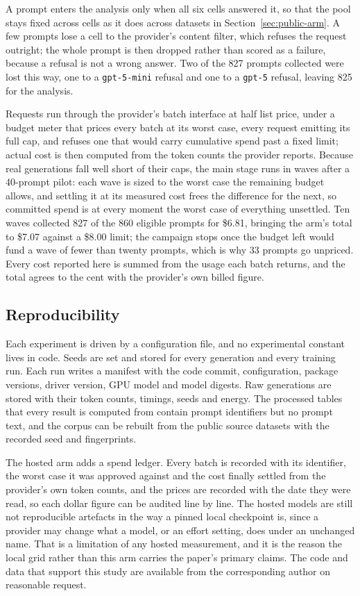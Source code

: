 A prompt enters the analysis only when all six cells answered it, so that the
pool stays fixed across cells as it does across datasets in
Section~\ref{sec:public-arm}. A few prompts lose a cell to the provider's
content filter, which refuses the request outright; the whole prompt is then
dropped rather than scored as a failure, because a refusal is not a wrong
answer. Two of the 827 prompts collected were lost this way, one to a
\texttt{gpt-5-mini} refusal and one to a \texttt{gpt-5} refusal, leaving
825 for the analysis.

Requests run through the provider's batch interface at half list price,
under a budget meter that prices every batch at its worst case, every
request emitting its full cap, and refuses one that would carry cumulative
spend past a fixed limit; actual cost is then computed from the token counts
the provider reports. Because real generations fall well short of their
caps, the main stage runs in waves after a 40-prompt pilot: each wave is
sized to the worst case the remaining budget allows, and settling it at its
measured cost frees the difference for the next, so committed spend is at
every moment the worst case of everything unsettled. Ten waves collected 827
of the 860 eligible prompts for \$6.81, bringing the arm's total to \$7.07
against a \$8.00 limit; the campaign stops once the budget left would fund a
wave of fewer than twenty prompts, which is why 33 prompts go unpriced.
Every cost reported here is summed from the usage each batch returns, and
the total agrees to the cent with the provider's own billed figure.

\subsection{Reproducibility}
\label{sec:repro}

Each experiment is driven by a configuration file, and no experimental
constant lives in code. Seeds are set and stored for every generation and
every training run. Each run writes a manifest with the code commit,
configuration, package versions, driver version, GPU model and model
digests. Raw generations are stored with their token counts, timings, seeds
and energy. The processed tables that every result is computed from contain
prompt identifiers but no prompt text, and the corpus can be rebuilt from
the public source datasets with the recorded seed and fingerprints.

The hosted arm adds a spend ledger. Every batch is recorded with its
identifier, the worst case it was approved against and the cost finally
settled from the provider's own token counts, and the prices are recorded
with the date they were read, so each dollar figure can be audited line by
line. The hosted models are still not reproducible artefacts in the way a
pinned local checkpoint is, since a provider may change what a model, or an
effort setting, does under an unchanged name. That is a limitation of any
hosted measurement, and it is the reason the local grid rather than this arm
carries the paper's primary claims.
The code and data that support this study are available from the
corresponding author on reasonable request.
